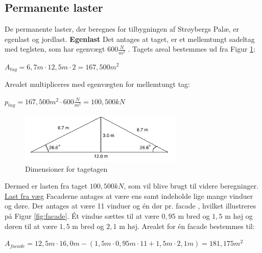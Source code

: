 \subsection{Permanente laster}
De permanente laster, der beregnes for tilbygningen af Strøybergs Palæ, er egenlast og jordlast.
\newline
\newline
\textbf{Egenlast}
\newline
Det antages at taget, er et mellemtungt sadeltag med teglsten, som har egenvægt $600 \frac{N}{m^2}$ \citep{tag}.
\newline
\newline
Tagets areal bestemmes ud fra Figur \ref{fig:tagetage}:
\begin{center}
	$A_{tag} = 6,\!7 m\cdot 12,\!5 m \cdot 2=167,\!500 m^2$
\end{center}

Arealet multipliceres med egenvægten for mellemtungt tag:
\begin{center}
	$p_{tag} = 167,\!500 m^2\cdot 600 \frac{N}{m^2}=100,\!500 kN$
\end{center}

\begin{figure}[htbp]
	\centering
	\includegraphics[width=0.7\textwidth]{billeder/Tagmedvinkel.png}
	\caption{Dimensioner for tagetagen}
	\label{fig:tagetage}
\end{figure}

Dermed er lasten fra taget $100,\!500 kN$, som vil blive brugt til videre beregninger.
\newline
\newline
\underline{Last fra væg}
\newline
Facaderne antages at være ens samt indeholde lige mange vinduer og døre. Der antages at være 11 vinduer og én dør pr. facade \citep{gammellokalplan}, hvilket illustreres på Figur \ref{fig:facade}.
\newline \indent{     }  Ét vindue sættes til at være $0,\!95$ m bred og $1,\!5$ m høj og døren til at være $1,\!5$ m bred og $2,\!1$ m høj. Arealet for én facade bestemmes til:
\begin{center}
	$A_{facade} = 12,\!5 m\cdot 16,\!0 m - (1,\!5 m\cdot0,\!95 m\cdot11 + 1,\!5 m\cdot 2,\!1 m)=181,\!175 m^2$
\end{center}

